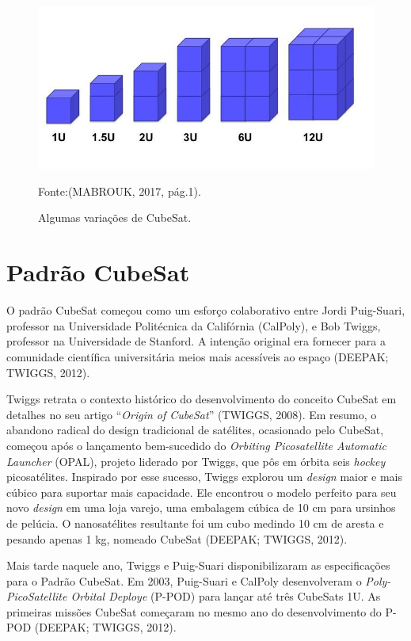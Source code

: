 {\small
\begin{figure}[h]
	\centering
    \caption{Algumas variações de CubeSat.}
	\includegraphics[keepaspectratio=true,scale=0.58]{figuras/cubesatVariacoes.PNG}	
	
	Fonte:(MABROUK, 2017, pág.1).
	\label{fig04}
\end{figure}
}

\section{Padrão CubeSat}

O padrão CubeSat começou como um esforço colaborativo entre Jordi Puig-Suari, professor na Universidade Politécnica da Califórnia (CalPoly), e Bob Twiggs, professor na Universidade de Stanford. A intenção original era fornecer para a comunidade científica universitária meios mais acessíveis ao espaço (DEEPAK; TWIGGS, 2012).

Twiggs retrata o contexto histórico do desenvolvimento do conceito CubeSat em detalhes no seu artigo “\textit{Origin of CubeSat}” (TWIGGS, 2008). Em resumo, o abandono radical do design tradicional de satélites, ocasionado pelo CubeSat, começou após o lançamento bem-sucedido do \textit{Orbiting Picosatellite Automatic Launcher} (OPAL), projeto liderado por Twiggs, que pôs em órbita seis \textit{hockey} picosatélites. Inspirado por esse sucesso, Twiggs explorou um \textit{design} maior e mais cúbico para suportar mais capacidade. Ele encontrou o modelo perfeito para seu novo \textit{design} em uma loja varejo, uma embalagem cúbica de 10 cm para ursinhos de pelúcia. O nanosatélites resultante foi um cubo medindo 10 cm de aresta e pesando apenas 1 kg, nomeado CubeSat (DEEPAK; TWIGGS, 2012).

Mais tarde naquele ano, Twiggs e Puig-Suari disponibilizaram as especificações para o Padrão CubeSat. Em 2003, Puig-Suari e CalPoly desenvolveram o \textit{Poly-PicoSatellite Orbital Deploye} (P-POD) para lançar até três CubeSats 1U. As primeiras missões CubeSat começaram no  mesmo ano do desenvolvimento do P-POD (DEEPAK; TWIGGS, 2012).

